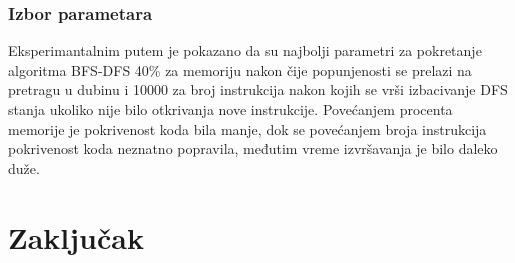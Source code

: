 \documentclass[12pt,oneside]{memoir}
\begin{document}
\subsection{Izbor parametara}

Eksperimantalnim putem je pokazano da su najbolji parametri za pokretanje algoritma BFS-DFS 40\% za memoriju nakon čije popunjenosti se prelazi na pretragu u dubinu i 10000 za broj instrukcija nakon kojih se vrši izbacivanje DFS stanja ukoliko nije bilo otkrivanja nove instrukcije. Povećanjem procenta memorije je pokrivenost koda bila manje, dok se povećanjem broja instrukcija pokrivenost koda neznatno popravila, međutim vreme izvršavanja je bilo daleko duže.

\chapter{Zaključak}

\printbibliography[heading=bibintoc,title=\foreignlanguage{serbian}{Literatura}]

\backmatter

\begin{biografija}
\end{biografija}
\end{document}
